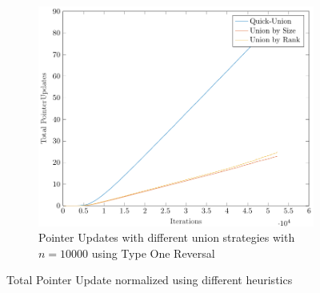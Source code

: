 \begin{figure}[ht]
\begin{subfigure}{0.32\textwidth}
    \end{subfigure}%
    \hfill
    \begin{subfigure}{0.32\textwidth}
        \centering
        \includegraphics[width=\textwidth]{../images/plotTORFull10000_PointerUpdates.pdf}
        \caption{Pointer Updates with different union strategies with $n = 10000$ using Type One Reversal}
    \end{subfigure}

    \caption{Total Pointer Update normalized using different heuristics}
    \label{fig:tpuH}
\end{figure}


